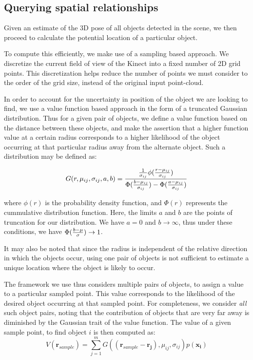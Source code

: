 \subsection{Querying spatial relationships}
Given an estimate of the 3D pose of all objects detected in the scene, we then proceed to calculate the potential location of a particular object. 

To compute this efficiently, we make use of a sampling based approach. We discretize the current field of view of the Kinect into a fixed number of 2D grid points. This discretization helps reduce the number of points we must consider to the order of the grid size, instead of the original input point-cloud. 

In order to account for the uncertainty in position of the object we are looking to find, we use a value function based approach in the form of a truncated Gaussian distribution. Thus for a given pair of objects, we define a value function based on the distance between these objects, and make the assertion that a higher function value at a certain radius corresponds to a higher likelihood of the object occurring at that particular radius away from the alternate object. Such a distribution may be defined as: 

$$G(r,\mu_{ij},\sigma_{ij},a,b) = {{{1\over \sigma_{ij}} \phi ( {{r-\mu_{ij}}\over{\sigma_{ij}}})}\over{\Phi ( {{b-\mu_{ij}}\over{\sigma_{ij}}}) - \Phi ( {{a-\mu_{ij}}\over{\sigma_{ij}}})}}$$

where $\phi(r)$ is the probability density function, and $\Phi(r)$ represents the cummulative distribution function. Here, the limits $a$ and $b$ are the points of truncation for our distribution. We have $a=0$ and $b \rightarrow \infty$, thus under these conditions, we have $\Phi({{b-\mu}\over{\sigma}}) \rightarrow 1$. 

It may also be noted that since the radius is independent of the relative direction in which the objects occur, using one pair of objects is not sufficient to estimate a unique location where the object is likely to occur. 

The framework we use thus considers multiple pairs of objects, to assign a value to a particular sampled point. This value corresponds to the likelihood of the desired object occurring at that sampled point. For completeness, we consider \textit{all} such object pairs, noting that the contribution of objects that are very far away is diminished by the Gaussian trait of the value function. The value of a given sample point, to find object $i$ is then computed as: 
\begin{equation}
V(\mathbf{r}_{sample})= \sum_{j=1}^m G((\mathbf{r}_{sample}-\mathbf{r_j}),\mu_{ij},\sigma_{ij}) p(\mathbf{x_i})
\end{equation}


